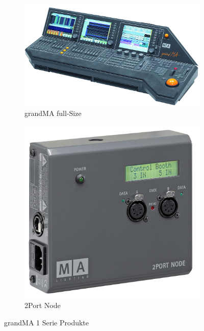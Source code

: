 \documentclass[11pt]{scrartcl}
\begin{document}
\begin{figure}[H]
    \centering
    \begin{subfigure}[b]{0.45\textwidth}
        \includegraphics[width=\textwidth]{images/grandMA_1.png}
        \caption{grandMA full-Size}
    \end{subfigure}
    \hfill 
    \begin{subfigure}[b]{0.25\textwidth}
        \includegraphics[width=\textwidth]{images/MA_2Port_Node_onPC_13019x.png}
        \captionsetup{justification=raggedright,singlelinecheck=false}
        \caption{2Port Node \cite{gmaproducts}}
    \end{subfigure}
    \caption{grandMA 1 Serie Produkte}\label{fig:gma1}
\end{figure}
\end{document}

